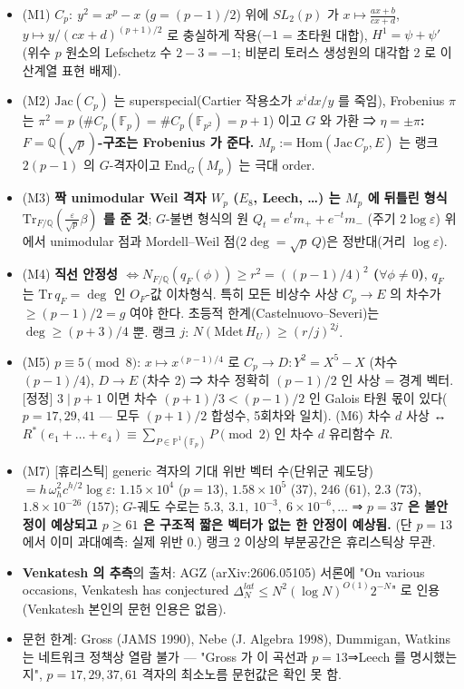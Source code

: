 \begin{itemize}
\tightlist
\item
  (M1) \(C_p:\ y^2=x^p-x\) (\(g=(p-1)/2\)) 위에 \(SL_2(p)\) 가 \(x\mapsto\frac{ax+b}{cx+d}\), \(y\mapsto y/(cx+d)^{(p+1)/2}\) 로 충실하게 작용(\(-1\) = 초타원 대합), \(H^1=\psi+\psi'\) (위수 \(p\) 원소의 Lefschetz 수 \(2-3=-1\); 비분리 토러스 생성원의 대각합 2 로 이산계열 표현 배제).
\item
  (M2) \(\mathrm{Jac}(C_p)\) 는 superspecial(Cartier 작용소가 \(x^idx/y\) 를 죽임), Frobenius \(\pi\) 는 \(\pi^2=p\) (\(\#C_p(\mathbb F_p)=\#C_p(\mathbb F_{p^2})=p+1\)) 이고 \(G\) 와 가환 ⇒ \textbf{\(\eta=\pm\pi\): \(F=\mathbb Q(\sqrt p)\)-구조는 Frobenius 가 준다.} \(M_p:=\mathrm{Hom}(\mathrm{Jac}\,C_p,E)\) 는 랭크 \(2(p-1)\) 의 \(G\)-격자이고 \(\mathrm{End}_G(M_p)\) 는 극대 order.
\item
  (M3) \textbf{짝 unimodular Weil 격자 \(W_p\) (\(E_8\), Leech, \ldots) 는 \(M_p\) 에 뒤틀린 형식 \(\mathrm{Tr}_{F/\mathbb Q}(\tfrac\varepsilon{\sqrt p}\beta)\) 를 준 것}; \(G\)-불변 형식의 원 \(Q_t=e^tm_++e^{-t}m_-\) (주기 \(2\log\varepsilon\)) 위에서 unimodular 점과 Mordell--Weil 점(\(2\deg=\sqrt p\,Q\))은 정반대(거리 \(\log\varepsilon\)).
\item
  (M4) \textbf{직선 안정성 \(\iff N_{F/\mathbb Q}(q_F(\phi))\ge r^2=((p-1)/4)^2\) (\(\forall\phi\ne0\))}, \(q_F\) 는 \(\mathrm{Tr}\,q_F=\deg\) 인 \(O_F\)-값 이차형식. 특히 모든 비상수 사상 \(C_p\to E\) 의 차수가 \(\ge(p-1)/2=g\) 여야 한다. 초등적 한계(Castelnuovo--Severi)는 \(\deg\ge(p+3)/4\) 뿐. 랭크 \(j\): \(N(\mathrm{Mdet}\,H_U)\ge(r/j)^{2j}\).
\item
  (M5) \(p\equiv5\pmod 8\): \(x\mapsto x^{(p-1)/4}\) 로 \(C_p\to D:Y^2=X^5-X\) (차수 \((p-1)/4\)), \(D\to E\) (차수 2) ⇒ 차수 정확히 \((p-1)/2\) 인 사상 = 경계 벡터. {[}정정{]} \(3\mid p+1\) 이면 차수 \((p+1)/3<(p-1)/2\) 인 Galois 타원 몫이 있다(\(p=17,29,41\) --- 모두 \((p+1)/2\) 합성수, 5회차와 일치). (M6) 차수 \(d\) 사상 ↔ \(R^*(e_1+\dots+e_4)\equiv\sum_{P\in\mathbb P^1(\mathbb F_p)}P\pmod2\) 인 차수 \(d\) 유리함수 \(R\).
\item
  (M7) {[}휴리스틱{]} generic 격자의 기대 위반 벡터 수(단위군 궤도당) \(=h\,\omega_h^2c^{h/2}\log\varepsilon\): \(1.15\times10^4\) (\(p=13\)), \(1.58\times10^5\) (\(37\)), \(246\) (\(61\)), \(2.3\) (\(73\)), \(1.8\times10^{-26}\) (\(157\)); \(G\)-궤도 수로는 \(5.3,\ 3.1,\ 10^{-3},\ 6\times10^{-6},\dots\) ⇒ \textbf{\(p=37\) 은 불안정이 예상되고 \(p\ge61\) 은 구조적 짧은 벡터가 없는 한 안정이 예상됨.} (단 \(p=13\) 에서 이미 과대예측: 실제 위반 0.) 랭크 2 이상의 부분공간은 휴리스틱상 무관.
\item
  \textbf{Venkatesh 의 추측}의 출처: AGZ (arXiv:2606.05105) 서론에 "On various occasions, Venkatesh has conjectured \(\Delta_N^{lat}\le N^2(\log N)^{O(1)}2^{-N}\)" 로 인용(Venkatesh 본인의 문헌 인용은 없음).
\item
  문헌 한계: Gross (JAMS 1990), Nebe (J. Algebra 1998), Dummigan, Watkins 는 네트워크 정책상 열람 불가 --- "Gross 가 이 곡선과 \(p=13\)⇒Leech 를 명시했는지", \(p=17,29,37,61\) 격자의 최소노름 문헌값은 확인 못 함.
\end{itemize}

